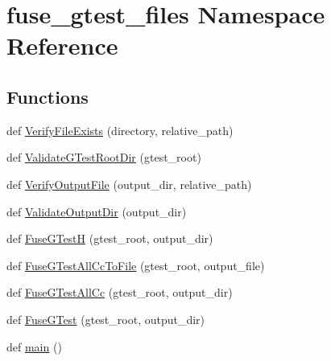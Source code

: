 \hypertarget{namespacefuse__gtest__files}{}\section{fuse\+\_\+gtest\+\_\+files Namespace Reference}
\label{namespacefuse__gtest__files}
\subsection*{Functions}
\begin{DoxyCompactItemize}
\item 
def \hyperlink{namespacefuse__gtest__files_a333eb5237899fe2f80b0c624ddba363d}{Verify\+File\+Exists} (directory, relative\+\_\+path)
\item 
def \hyperlink{namespacefuse__gtest__files_aa53690cd3c4ff01cfeea470f363f1dec}{Validate\+G\+Test\+Root\+Dir} (gtest\+\_\+root)
\item 
def \hyperlink{namespacefuse__gtest__files_ac3cc183b2fc035aff5b7bc07979b486d}{Verify\+Output\+File} (output\+\_\+dir, relative\+\_\+path)
\item 
def \hyperlink{namespacefuse__gtest__files_a9f584226b1f996ffff820e0751dbd458}{Validate\+Output\+Dir} (output\+\_\+dir)
\item 
def \hyperlink{namespacefuse__gtest__files_a95685ab66129ced9d7b3db78e6001c8b}{Fuse\+G\+TestH} (gtest\+\_\+root, output\+\_\+dir)
\item 
def \hyperlink{namespacefuse__gtest__files_ae0209897b164dbb8702169630f4bbf61}{Fuse\+G\+Test\+All\+Cc\+To\+File} (gtest\+\_\+root, output\+\_\+file)
\item 
def \hyperlink{namespacefuse__gtest__files_a9bcdfab09f297e2b2097d9cdde5ee092}{Fuse\+G\+Test\+All\+Cc} (gtest\+\_\+root, output\+\_\+dir)
\item 
def \hyperlink{namespacefuse__gtest__files_a4e7007ceec3a7a25617eac3342563ed6}{Fuse\+G\+Test} (gtest\+\_\+root, output\+\_\+dir)
\item 
def \hyperlink{namespacefuse__gtest__files_a5eaf924c10970f574e1b0459cbbda75a}{main} ()
\end{DoxyCompactItemize}
